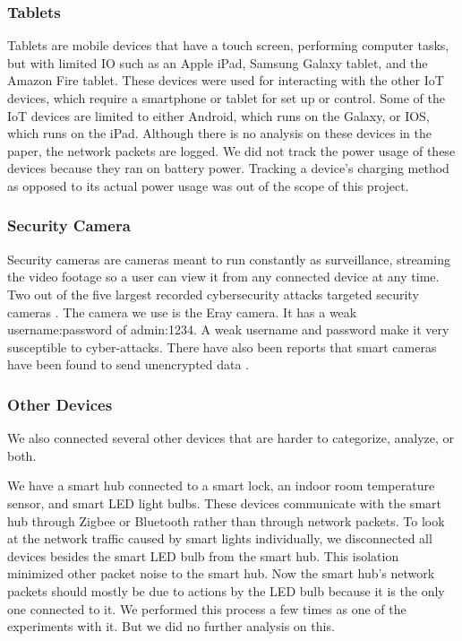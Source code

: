 \subsubsection{Tablets}
Tablets are mobile devices that have a touch screen, performing computer tasks, but with limited IO such as an Apple iPad, Samsung Galaxy tablet, and the Amazon Fire tablet. These devices were used for interacting with the other IoT devices, which require a smartphone or tablet for set up or control. Some of the IoT devices are limited to either Android, which runs on the Galaxy, or IOS, which runs on the iPad. Although there is no analysis on these devices in the paper, the network packets are logged. We did not track the power usage of these devices because they ran on battery power. Tracking a device's charging method as opposed to its actual power usage was out of the scope of this project.

\subsubsection{Security Camera}
Security cameras are cameras meant to run constantly as surveillance, streaming the video footage so a user can view it from any connected device at any time. Two out of the five largest recorded cybersecurity attacks targeted security cameras \cite{guest_2018}. The camera we use is the Eray camera. It has a weak username:password of admin:1234. A weak username and password make it very susceptible to cyber-attacks. There have also been reports that smart cameras have been found to send unencrypted data \cite{feamster_2016}.

\subsubsection{Other Devices}
We also connected several other devices that are harder to categorize, analyze, or both.

We have a smart hub connected to a smart lock, an indoor room temperature sensor, and smart LED light bulbs. These devices communicate with the smart hub through Zigbee or Bluetooth rather than through network packets. To look at the network traffic caused by smart lights individually, we disconnected all devices besides the smart LED bulb from the smart hub. This isolation minimized other packet noise to the smart hub. Now the smart hub's network packets should mostly be due to actions by the LED bulb because it is the only one connected to it. We performed this process a few times as one of the experiments with it. But we did no further analysis on this.

